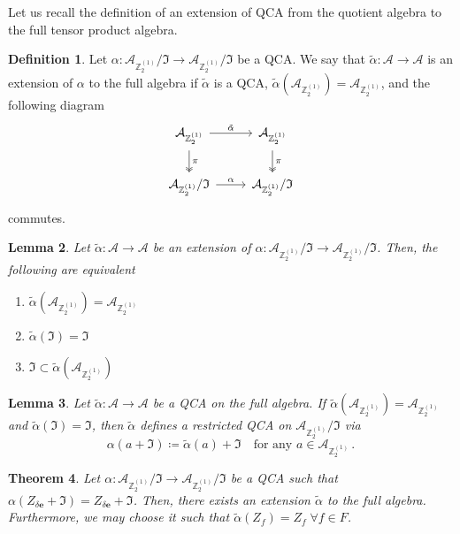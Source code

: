 \documentclass[aps,twocolumn,prx,floatfix,preprintnumbers, nofootinbib,10pt]{revtex4-2}
\numberwithin{equation}{section}
\newtheorem{theorem}{Theorem}[section]
\newtheorem{lemma}[theorem]{Lemma}
\theoremstyle{definition}
\newtheorem{definition}[theorem]{Definition}
\theoremstyle{remark}
\theoremstyle{claim}
\newcommand{\be}{\begin{equation}}
\newcommand{\ee}{\end{equation}}
\newcommand{\Z}{{\mathbb Z}}
\newcommand{\mc}[1]{\mathcal{#1}}
\begin{document}
Let us recall the definition of an extension of QCA from the quotient algebra to the full tensor product algebra.

\begin{definition}\label{def:QCA_extension}
 Let $\alpha : \mc{A}_{\Z_2^{(1)}} / \mathfrak{I} \rightarrow \mc{A}_{\Z_2^{(1)}} / \mathfrak{I}$ be a QCA. We say that $\tilde{\alpha} : \mc{A} \rightarrow \mc{A}$ is an extension of $\alpha$ to the full algebra if $\tilde{\alpha}$ is a QCA, $\tilde{\alpha}(\mc{A}_{\Z_2^{(1)}}) = \mc{A}_{\Z_2^{(1)}}$, and the following diagram
 \be
 \begin{tikzcd}[nodes={inner sep=5pt}]
  \mc{A}_{\Z_2^{(1)}} \arrow[r, "\tilde{\alpha}"] \arrow[d, "\pi", two heads] & \mc{A}_{\Z_2^{(1)}} \arrow[d, "\pi", two heads] \\
  \mc{A}_{\Z_2^{(1)}} / \mathfrak{I} \arrow[r, "\alpha"]      & \mc{A}_{\Z_2^{(1)}} / \mathfrak{I}
 \end{tikzcd}
 \ee
 commutes.
\end{definition}

\begin{lemma}
 Let $\tilde{\alpha} : \mc{A} \rightarrow \mc{A}$ be an extension of $\alpha : \mc{A}_{\Z_2^{(1)}} / \mathfrak{I} \rightarrow \mc{A}_{\Z_2^{(1)}} / \mathfrak{I}$. Then, the following are equivalent
 \begin{enumerate}
  \item $\tilde{\alpha}(\mc{A}_{\Z_2^{(1)}}) = \mc{A}_{\Z_2^{(1)}}$

  \item $\tilde{\alpha}(\mathfrak{I}) = \mathfrak{I}$

  \item $\mathfrak{I} \subset \tilde{\alpha}(\mc{A}_{\Z_2^{(1)}})$
 \end{enumerate}
\end{lemma}

\begin{lemma}
 Let $\tilde{\alpha} : \mc{A} \rightarrow \mc{A}$ be a QCA on the full algebra. If $\tilde{\alpha}(\mc{A}_{\Z_2^{(1)}}) = \mc{A}_{\Z_2^{(1)}}$ and $\tilde{\alpha}(\mathfrak{I}) = \mathfrak{I}$, then $\tilde{\alpha}$ defines a restricted QCA on $\mc{A}_{\Z_2^{(1)}} / \mathfrak{I}$ via
 \be
 \alpha(a + \mathfrak{I}) \coloneqq \tilde{\alpha}(a) + \mathfrak{I} \quad \text{for any } a \in \mc{A}_{\Z_2^{(1)}} \,.
 \ee
\end{lemma}

\begin{theorem}\label{thm:QCA_extendability}
 Let $\alpha : \mc{A}_{\Z_2^{(1)}} / \mathfrak{I} \rightarrow \mc{A}_{\Z_2^{(1)}} / \mathfrak{I}$ be a QCA such that $\alpha(Z_{\delta \bm{e}} + \mathfrak{I}) = Z_{\delta \bm{e}} + \mathfrak{I}$. Then, there exists an extension $\tilde{\alpha}$ to the full algebra. Furthermore, we may choose it such that $\tilde{\alpha}(Z_f) = Z_f \; \forall f \in F$.
\end{theorem}
\end{document}
